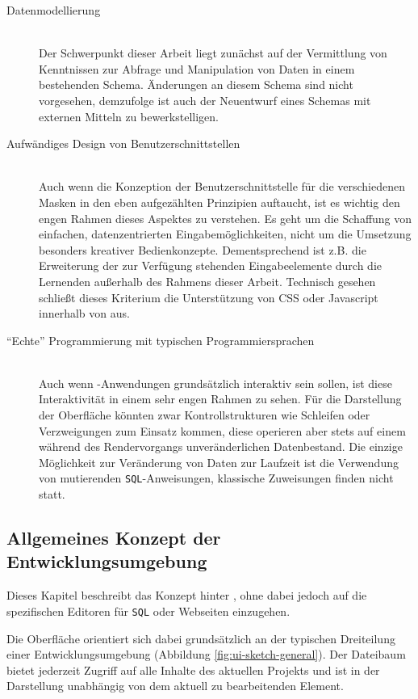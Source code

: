 \begin{description}
\item[Datenmodellierung] \label{scope:no-data-modelling} \hfill \\
  Der Schwerpunkt dieser Arbeit liegt zunächst auf der Vermittlung von Kenntnissen zur Abfrage und Manipulation von Daten in einem bestehenden Schema. Änderungen an diesem Schema sind nicht vorgesehen, demzufolge ist auch der Neuentwurf eines Schemas mit externen Mitteln zu bewerkstelligen.
\item[Aufwändiges Design von Benutzerschnittstellen] \label{scope:no-design} \hfill \\
  Auch wenn die Konzeption der Benutzerschnittstelle für die verschiedenen Masken in den eben aufgezählten Prinzipien auftaucht, ist es wichtig den engen Rahmen dieses Aspektes zu verstehen. Es geht um die Schaffung von einfachen, datenzentrierten Eingabemöglichkeiten, nicht um die Umsetzung besonders kreativer Bedienkonzepte. Dementsprechend ist z.B. die Erweiterung der zur Verfügung stehenden Eingabeelemente durch die Lernenden außerhalb des Rahmens dieser Arbeit. Technisch gesehen schließt dieses Kriterium die Unterstützung von CSS oder Javascript innerhalb von \idename{} aus.
\item["`Echte"' Programmierung mit typischen Programmiersprachen] \label{scope:no-programming} \hfill \\
  Auch wenn \idename{}-Anwendungen grundsätzlich interaktiv sein sollen, ist diese Interaktivität in einem sehr engen Rahmen zu sehen. Für die Darstellung der Oberfläche könnten zwar Kontrollstrukturen wie Schleifen oder Verzweigungen zum Einsatz kommen, diese operieren aber stets auf einem während des Rendervorgangs unveränderlichen Datenbestand. Die einzige Möglichkeit zur Veränderung von Daten zur Laufzeit ist die Verwendung von mutierenden \texttt{SQL}-Anweisungen, klassische Zuweisungen finden nicht statt.
\end{description}

\subsection{Allgemeines Konzept der Entwicklungsumgebung}
\label{sec:design-general-concept}

Dieses Kapitel beschreibt das Konzept hinter \idename{}, ohne dabei jedoch auf die spezifischen Editoren für \texttt{SQL} oder Webseiten einzugehen.

Die Oberfläche orientiert sich dabei grundsätzlich an der typischen Dreiteilung einer Entwicklungsumgebung (Abbildung \ref{fig:ui-sketch-general}). Der Dateibaum bietet jederzeit Zugriff auf alle Inhalte des aktuellen Projekts und ist in der Darstellung unabhängig von dem aktuell zu bearbeitenden Element.

